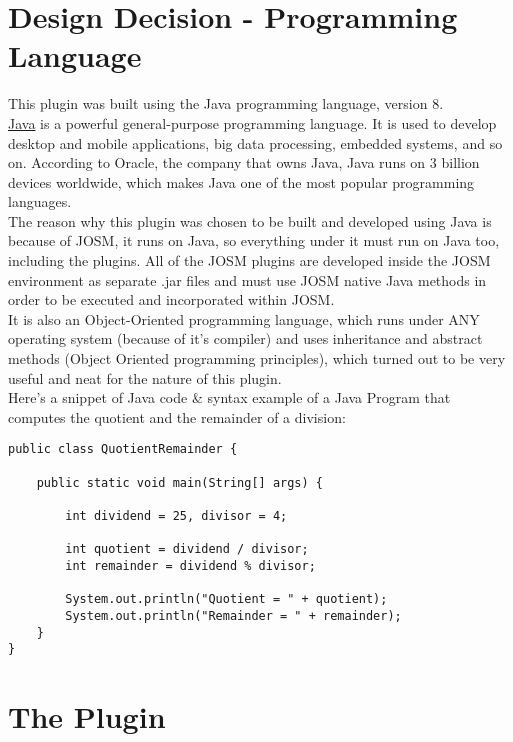 \section{Design Decision - Programming Language}
This plugin was built using the Java programming language, version 8.\\
\newline
\href{https://www.java.com/en/}{Java} is a powerful general-purpose programming language. It is used to develop desktop and mobile applications, big data processing, embedded systems, and so on. According to Oracle, the company that owns Java, Java runs on 3 billion devices worldwide, which makes Java one of the most popular programming languages. \cite{WhatIsJava}\\
\newline
The reason why this plugin was chosen to be built and developed using Java is because of JOSM, it runs on Java, so everything under it must run on Java too, including the plugins. All of the JOSM plugins are developed inside the JOSM environment as separate .jar files and must use JOSM native Java methods in order to be executed and incorporated within JOSM.\\
It is also an Object-Oriented programming language, which runs under ANY operating system (because of it's compiler) and uses inheritance and abstract methods (Object Oriented programming principles), which turned out to be very useful and neat for the nature of this plugin.\\
\newline
Here's a snippet of Java code \& syntax example of a Java Program that computes the quotient and the remainder of a division: \cite{JavaExampleQuadraticEquation}
\begin{verbatim}
public class QuotientRemainder {
	
	public static void main(String[] args) {
		
		int dividend = 25, divisor = 4;
		
		int quotient = dividend / divisor;
		int remainder = dividend % divisor;
		
		System.out.println("Quotient = " + quotient);
		System.out.println("Remainder = " + remainder);
	}
}
\end{verbatim}
\newpage
\section{The Plugin}
\label{sec:ThePlugin}
\lipsum[8-9]

